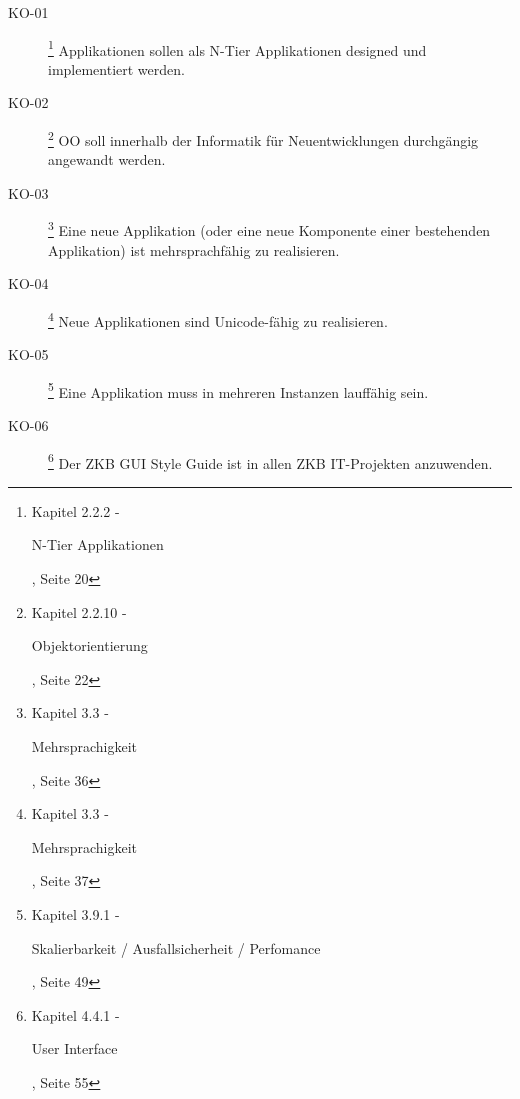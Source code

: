 \documentclass[
11pt, %
a4paper, %
BCOR25mm, %
DIV14, %
footsepline = false, %
headsepline, %
twoside, %
openright,
abstracton, %
listof=totocnumbered, %
bibliography=totocnumbered %
]{scrreprt}
\begin{document}
  \begin{description}

    \item[KO-01\label{itm:KO-01}]
    \footnote{\cite{ZkbHandbuchDerItArchitektur} Kapitel 2.2.2 -
    \begin{itshape}N-Tier Applikationen\end{itshape}, Seite 20}
    Applikationen sollen als N-Tier Applikationen designed und
    implementiert werden.

    \item[KO-02\label{itm:KO-02}]
    \footnote{\cite{ZkbHandbuchDerItArchitektur} Kapitel 2.2.10 -
    \begin{itshape}Objektorientierung\end{itshape}, Seite 22}
    \ac{OO} soll innerhalb der Informatik für Neuentwicklungen
    durchgängig angewandt werden.

    \item[KO-03\label{itm:KO-03}]
    \footnote{\cite{ZkbHandbuchDerItArchitektur} Kapitel 3.3 -
    \begin{itshape}Mehrsprachigkeit\end{itshape}, Seite 36}
    Eine neue Applikation (oder eine neue Komponente einer
    bestehenden Applikation) ist mehrsprachfähig zu realisieren.

    \item[KO-04\label{itm:KO-04}]
    \footnote{\cite{ZkbHandbuchDerItArchitektur} Kapitel 3.3 -
    \begin{itshape}Mehrsprachigkeit\end{itshape}, Seite 37}
    Neue Applikationen sind Unicode-fähig zu realisieren.

    \item[KO-05\label{itm:KO-05}]
    \footnote{\cite{ZkbHandbuchDerItArchitektur} Kapitel 3.9.1 -
    \begin{itshape}Skalierbarkeit / Ausfallsicherheit / Perfomance\end{itshape},
    Seite 49}
    Eine Applikation muss in mehreren Instanzen lauffähig sein.

    \item[KO-06\label{itm:KO-06}]
    \footnote{\cite{ZkbHandbuchDerItArchitektur} Kapitel 4.4.1 -
    \begin{itshape}User Interface\end{itshape}, Seite 55}
    Der ZKB GUI Style Guide ist in allen ZKB IT-Projekten anzuwenden.
    

\end{description}
\end{document}
